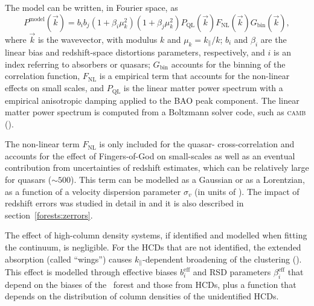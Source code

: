 The model can be written, in Fourier space, as 
\begin{equation}
    P^\mathrm{model}(\vec{k}) = b_i b_j 
        \left(1+\beta_i \mu^2_k\right) \left(1+\beta_j \mu^2_k\right) 
        P_\mathrm{ QL}(\vec{k}) F_\mathrm{NL}(\vec{k})G_\mathrm{ bin}(\vec{k}), 
    \label{eq:power_spectrum}
\end{equation}
where $\vec{k}$ is the wavevector, with modulus $k$ and $\mu_k = k_\parallel/k$;
$b_i$ and $\beta_i$ are the linear bias and redshift-space distortions parameters, respectively,
and $i$ is an index referring to absorbers or quasars; 
$G_\mathrm{ bin}$ accounts for the binning of the correlation function, 
$F_\mathrm{NL}$ is a empirical term that accounts for the non-linear effects on small scales, 
and $ P_\mathrm{ QL}$ is the linear matter power spectrum with a empirical anisotropic 
damping applied to the BAO peak component. 
The linear matter power spectrum is computed from a Boltzmann solver code, 
such as \textsc{camb} (\cite{lewisEfficientComputationCosmic2000}). 

The non-linear term $F_\mathrm{NL}$ is only included for the quasar-\lya 
cross-correlation and accounts for the effect of Fingers-of-God on small-scales as well as 
an eventual contribution from uncertainties of redshift estimates,
which can be relatively large for quasars ($\sim 500$\kms). 
This term can be modelled as a Gaussian or as a Lorentzian, as a function of a 
velocity dispersion parameter $\sigma_v$ (in units of \kms).
The impact of redshift errors was studied in detail in 
\cite{youlesEffectQuasarRedshift2022a} and it is also described in 
section~\ref{forests:zerrors}.

The effect of high-column density systems, if identified and modelled 
when fitting the continuum, is negligible. For the HCDs that are 
not identified, the extended absorption (called ``wings'') causes 
$k_\parallel$-dependent broadening of the clustering 
(\cite{font-riberaEffectHighColumn2012,
rogersCorrelationsThreedimensionalLymanalpha2018}). 
This effect is modelled through effective biases $b_i^\mathrm{eff}$ 
and RSD parameters $\beta_i^\mathrm{eff}$ that depend on the 
biases of the \lya\ forest and those from HCDs, plus a function 
that depends on the distribution of column densities of the unidentified 
HCDs. 

